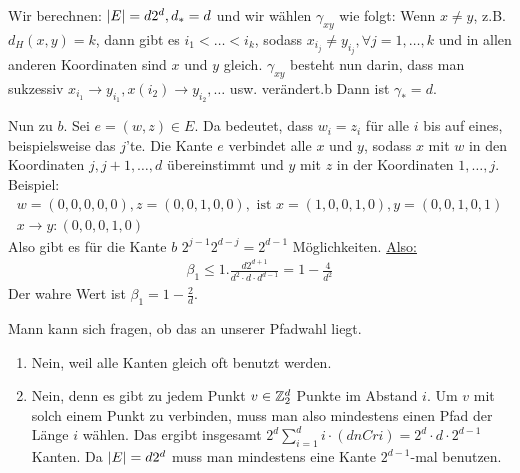 \begin{beispiel}
	 Wir berechnen: $\lvert E\rvert = d 2^d, d_* = d$ und wir wählen $\gamma_{xy}$ wie folgt: Wenn $x \neq y$, z.B. $d_H(x,y) = k$, dann gibt es $i_1 < \dots < i_k$, sodass $x_{i_j} \neq y_{i_j}, \forall j = 1, \dots, k$ und in allen anderen Koordinaten sind $x$ und $y$ gleich. $\gamma_{xy}$ besteht nun darin, dass man sukzessiv $x_{i_1} \to y_{i_1}, x(i_2) \to y_{i_2}, \dots$ usw. verändert.b Dann ist $\gamma_* = d$.

	Nun zu $b$. Sei $e = (w,z) \in E$. Da bedeutet, dass $w_i = z_i$ für alle $i$ bis auf eines, beispielsweise das $j$'te. Die Kante $e$ verbindet alle $x$ und $y$, sodass $x$ mit $w$ in den Koordinaten $j,j+1,\dots,d$ übereinstimmt und $y$ mit $z$ in der Koordinaten $1, \dots, j$. Beispiel:
	\begin{gather}
		w = (0,0,0,0,0), z = (0,0,1,0,0), \text{ ist } x = (1,0,0,1,0), y = (0,0,1,0,1) \\
		x\to y: (0,0,0,1,0)
	\end{gather}
	Also gibt es für die Kante $b$ $2^{j-1} 2^{d-j} = 2^{d-1}$ Möglichkeiten. \underline{Also:}
	\begin{align}
		\beta_1 \leq 1 . \frac{d2^{d+1}}{d^2 \cdot d \cdot d^{d-1}} = 1 - \frac{4}{d^2}
	\end{align}
	Der wahre Wert ist $\beta_1 = 1 - \frac{2}{d}$. 
	\begin{bemerkung}
		Mann kann sich fragen, ob das an unserer Pfadwahl liegt.
		\begin{enumerate}
			\item Nein, weil alle Kanten gleich oft benutzt werden. 
			\item Nein, denn es gibt zu jedem Punkt $v \in \mathbb{Z}^d_2$ Punkte im Abstand $i$. Um $v$ mit solch einem Punkt zu verbinden, muss man also mindestens einen Pfad der Länge $i$ wählen. Das ergibt insgesamt $2^d \sum_{i = 1}^{d} i \cdot (d nCr i) = 2^d \cdot d \cdot 2^{d-1}$ Kanten. Da $\lvert E\rvert = d 2^d$ muss man mindestens eine Kante $2^{d-1}$-mal benutzen.
		\end{enumerate}
	\end{bemerkung}
\end{beispiel}

